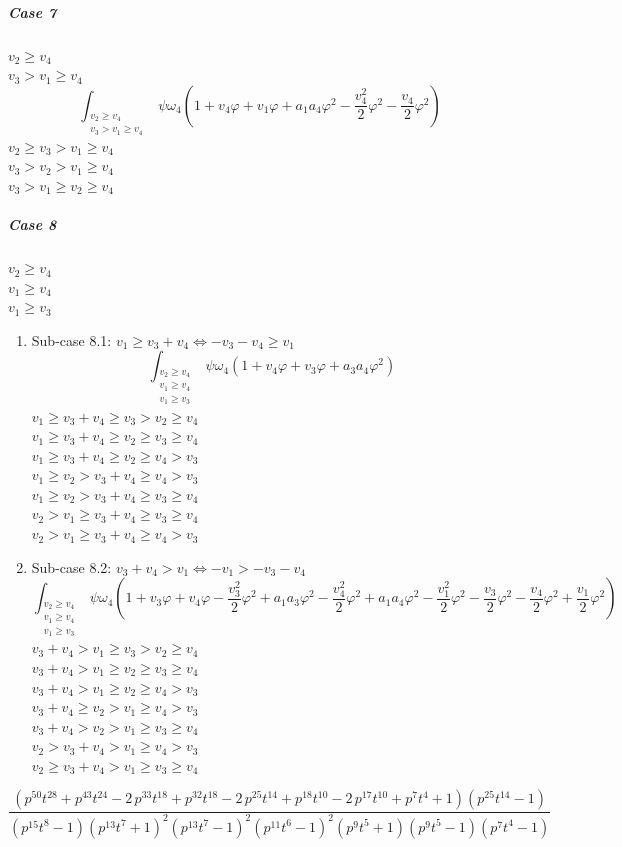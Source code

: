\documentclass{article}
\begin{document}
\subparagraph{Case 7}
$v_2\geq{v_4}$\\
$v_3>v_1\geq{v_4}$\\
\[\int_{\substack{v_2\geq{v_4}\\v_3>v_1\geq{v_4}}}\psi\omega_4\left(1+v_4\varphi+v_1\varphi+a_1a_4\varphi^2-\frac{v_4^2}{2}\varphi^2-\frac{v_4}{2}\varphi^2\right)\]
$v_2\geq{v}_3>{v}_1\geq{v_4}$\\
$v_3>v_2>v_1\geq{v_4}$\\
$v_3>v_1\geq{v}_2\geq{v_4}$\\
\subparagraph{Case 8}
$v_2\geq{v_4}$\\
$v_1\geq{v_4}$\\
$v_1\geq{v_3}$\\
\begin{enumerate}
    \item  Sub-case 8.1: $v_1\geq{v_3+v_4}\iff-v_3-v_4\geq{v}_1$
    \[\int_{\substack{v_2\geq{v_4}\\v_1\geq{v_4}\\v_1\geq{v_3}}}\psi\omega_4\left(1+v_4\varphi+v_3\varphi+a_3a_4\varphi^2\right)\]
$v_1\geq{v}_3+v_4\geq{v}_3>{v_2}\geq{v}_4$\\
$v_1\geq{v}_3+v_4\geq{v}_2\geq{v_3}\geq{v}_4$\\
$v_1\geq{v}_3+v_4\geq{v}_2\geq{v_4}>v_3$\\
$v_1\geq{v}_2>v_3+v_4\geq{v_4}>v_3$\\
$v_1\geq{v}_2>v_3+v_4\geq{v_3}\geq{v_4}$\\
$v_2>v_1\geq{v}_3+v_4\geq{v_3}\geq{v_4}$\\
$v_2>v_1\geq{v}_3+v_4\geq{v_4}>{v_3}$\\
\item Sub-case 8.2: $v_3+v_4>v_1\iff-v_1>-v_3-v_4$
\[\int_{\substack{v_2\geq{v_4}\\v_1\geq{v_4}\\v_1\geq{v_3}}}\psi\omega_4\left(1+v_3\varphi+v_4\varphi-\frac{v_3^2}{2}\varphi^2+a_1a_3\varphi^2-\frac{v_4^2}{2}\varphi^2+a_1a_4\varphi^2-\frac{v_1^2}{2}\varphi^2-\frac{v_3}{2}\varphi^2-\frac{v_4}{2}\varphi^2+\frac{v_1}{2}\varphi^2\right)\]
$v_3+v_4>v_1\geq{v}_3>{v_2}\geq{v}_4$\\
$v_3+v_4>v_1\geq{v}_2\geq{v_3}\geq{v}_4$\\
$v_3+v_4>v_1\geq{v}_2\geq{v_4}>v_3$\\
$v_3+v_4\geq{v}_2>v_1\geq{v_4}>v_3$\\
$v_3+v_4>v_2>v_1\geq{v_3}\geq{v}_4$\\
$v_2>v_3+v_4>v_1\geq{v_4}>v_3$\\
$v_2\geq{v}_3+v_4>v_1\geq{v_3}\geq{v}_4$\\
\end{enumerate}
\pagebreak
\[
\frac{{\left(p^{50} t^{28} + p^{43} t^{24} - 2 \, p^{33} t^{18} + p^{32} t^{18} - 2 \, p^{25} t^{14} + p^{18} t^{10} - 2 \, p^{17} t^{10} + p^{7} t^{4} + 1\right)} {\left(p^{25} t^{14} - 1\right)}}{{\left(p^{15} t^{8} - 1\right)} {\left(p^{13} t^{7} + 1\right)}^{2} {\left(p^{13} t^{7} - 1\right)}^{2} {\left(p^{11} t^{6} - 1\right)}^{2} {\left(p^{9} t^{5} + 1\right)} {\left(p^{9} t^{5} - 1\right)} {\left(p^{7} t^{4} - 1\right)}}
\]
\end{document}
